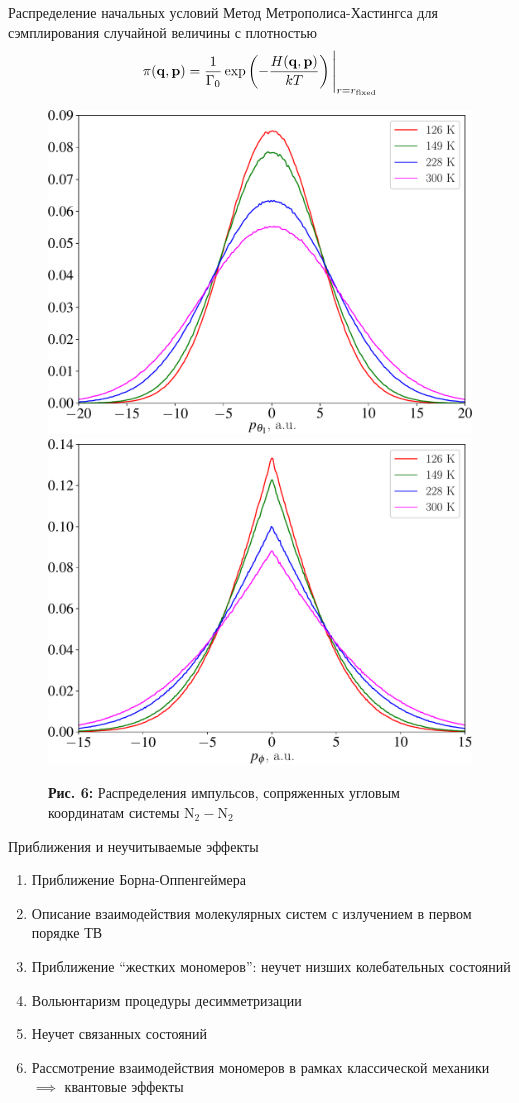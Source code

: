 \documentclass[10pt,usenames,pdf,hyperref={unicode},dvipsnames]{beamer}
\newcommand{\lb}{\left(}
\newcommand{\rb}{\right)}
\newcommand{\mf}{\mathbf}
\newcommand{\mycaption}[2]{
    \textbf{#1:} #2
}
\begin{document}
\begin{frame}{Распределение начальных условий}
    \vspace*{-0.1cm}
	Метод Метрополиса-Хастингса для сэмплирования случайной величины с плотностью  
    \vspace*{-0.1cm}
    \begin{gather}
        \pi(\mf{q}, \mf{p}) = \frac{1}{\Gamma_0} \exp \lb -\frac{H(\mf{q}, \mf{p})}{kT} \rb \Bigg{|}_{r = r_\text{fixed}} \notag
    \end{gather}

    \begin{figure}[H]
        \includegraphics[width=0.49\linewidth]{./pictures/pTheta1-crop.pdf}
        \includegraphics[width=0.49\linewidth]{./pictures/pPhi-crop.pdf}
        \mycaption{Рис. 6}{Распределения импульсов, сопряженных угловым координатам системы N$_2-$N$_2$}
    \end{figure}
\end{frame}

\begin{frame}{Приближения и неучитываемые эффекты}
    \begin{enumerate}
        \item Приближение Борна-Оппенгеймера 
        \item Описание взаимодействия молекулярных систем с излучением в первом порядке ТВ
        \item Приближение \enquote{жестких мономеров}: неучет низших колебательных состояний
        \item Вольюнтаризм процедуры десимметризации
        \item Неучет связанных состояний
        \item Рассмотрение взаимодействия мономеров в рамках классической механики $\implies$ квантовые эффекты
    \end{enumerate}
\end{frame}
\end{document}

